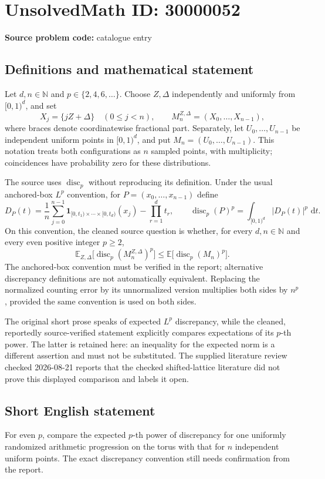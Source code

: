 \documentclass[11pt]{article}
\newcommand{\N}{\mathbb{N}}
\newcommand{\E}{\mathbb{E}}
\newcommand{\dd}{\,\mathrm{d}}
\begin{document}
\section*{UnsolvedMath ID: 30000052}
\textbf{Source problem code:} catalogue entry
\subsection{Definitions and mathematical statement}
Let \(d,n\in\N\) and \(p\in\{2,4,6,\ldots\}\). Choose \(Z,\Delta\) independently and uniformly from \([0,1)^d\), and set
\[
X_j=\{jZ+\Delta\}\quad(0\leq j<n),\qquad
M_n^{Z,\Delta}=(X_0,\ldots,X_{n-1}),
\]
where braces denote coordinatewise fractional part. Separately, let \(U_0,\ldots,U_{n-1}\) be independent uniform points in \([0,1)^d\), and put \(M_n=(U_0,\ldots,U_{n-1})\). This notation treats both configurations as \(n\) sampled points, with multiplicity; coincidences have probability zero for these distributions.

The source uses \(\operatorname{disc}_p\) without reproducing its definition. Under the usual anchored-box \(L^p\) convention, for \(P=(x_0,\ldots,x_{n-1})\) define
\[
D_P(t)=\frac1n\sum_{j=0}^{n-1}\mathbf1_{[0,t_1)\times\cdots\times[0,t_d)}(x_j)-\prod_{r=1}^d t_r,
\qquad
\operatorname{disc}_p(P)^p=\int_{[0,1)^d}|D_P(t)|^p\,\dd t.
\]
On this convention, the cleaned source question is whether, for every \(d,n\in\N\) and every even positive integer \(p\geq2\),
\[
\E_{Z,\Delta}\bigl[\operatorname{disc}_p(M_n^{Z,\Delta})^p\bigr]
\leq
\E\bigl[\operatorname{disc}_p(M_n)^p\bigr].
\]
The anchored-box convention must be verified in the report; alternative discrepancy definitions are not automatically equivalent. Replacing the normalized counting error by its unnormalized version multiplies both sides by \(n^p\), provided the same convention is used on both sides.

The original short prose speaks of expected \(L^p\) discrepancy, while the cleaned, reportedly source-verified statement explicitly compares expectations of its \(p\)-th power. The latter is retained here: an inequality for the expected norm is a different assertion and must not be substituted. The supplied literature review checked 2026-08-21 reports that the checked shifted-lattice literature did not prove this displayed comparison and labels it open.
\subsection{Short English statement}
For even \(p\), compare the expected \(p\)-th power of discrepancy for one uniformly randomized arithmetic progression on the torus with that for \(n\) independent uniform points. The exact discrepancy convention still needs confirmation from the report.
\end{document}
